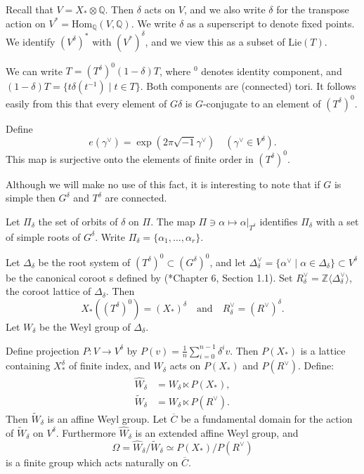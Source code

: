 \documentclass[10pt,leqno]{article}
\newcommand{\Hom}{\text{Hom}}
\newcommand{\Lie}{\text{Lie}}
\newcommand{\Z}{\mathbb Z}
\newcommand{\Q}{\mathbb Q}
\newcommand{\ch}[1]{#1^\vee}
\newcommand\inv{^{-1}}
\newcommand\wt{\widetilde}
\newcommand\wh{\widehat}
\begin{document}
Recall that $V=X_*\otimes\Q$. Then $\delta$ acts on $V$, and we also write
$\delta$ for the transpose action on $V^*=\Hom_\Q(V,\Q)$.
We write $\delta$ as a superscript to denote fixed points.
We identify $(V^\delta)^*$ with $(V^*)^\delta$, and we view this as a subset of $\Lie(T)$.

We can write $T=(T^\delta)^0(1-\delta)T$, where $\phantom{}^0$ denotes identity component,
and $(1-\delta)T=\{t\delta(t\inv)\mid t\in T\}$. Both components are (connected) tori.
It follows easily from this that every element of $G\delta$ is $G$-conjugate
to an element of $(T^\delta)^0$.

Define
\begin{equation}
\label{e:e}
e(\ch\gamma)=\exp(2\pi \sqrt{-1}\ch\gamma) \quad(\ch\gamma\in V^\delta).
\end{equation}
This map is surjective  onto the elements of finite order in $(T^\delta)^0$.

Although we will make no use of this fact, it is interesting to note that if $G$ is simple then
$G^\delta$  and $T^\delta$ are connected.

Let $\Pi_\delta$ the set of orbits of $\delta$ on $\Pi$. The map
$\Pi\ni\alpha\mapsto \alpha|_{T^{\delta}}$ identifies $\Pi_\delta$ with 
a set of simple roots of 
$G^{\delta}$. Write $\Pi_\delta=\{\alpha_1,\dots,\alpha_r\}$.

Let $\Delta_\delta$ be the root system of
$(T^{\delta})^0\subset (G^{\delta})^0$, and let
$\ch\Delta_\delta=\{\ch\alpha\mid \alpha\in\Delta_\delta\}\subset
V^\delta$ be the canonical coroot
s defined by
(\cite{bourbaki_4-6}*{Chapter 6, Section 1.1}).
Set $\ch R_\delta=\Z\langle\ch\Delta_\delta\rangle$, the coroot lattice of $\Delta_\delta$.
Then
$$
X_*((T^{\delta})^0)=(X_*)^\delta\quad\text{and}\quad \ch R_\delta=(\ch R)^\delta.
$$
Let $W_\delta$ be the Weyl group of $\Delta_\delta$.

Define projection $P:V\rightarrow V^\delta$ by
$P(v)=\frac1n \sum_{i=0}^{n-1}\delta^iv$.
Then $P(X_*)$ is a lattice containing $X_*^\delta$ of finite index,
and $W_\delta$ acts on $P(X_*)$ and $P(\ch R)$. Define:
\begin{equation}
\label{e:affine}
\begin{aligned}
\wh W_\delta&=W_\delta\ltimes P(X_*), \\
\wt W_\delta&=W_\delta\ltimes P(\ch R).
\end{aligned}
\end{equation}
Then $\wt W_\delta$ is an affine Weyl group. Let $\overline C$ be a
fundamental domain for the action of $\wt W_\delta$ on $V^\delta$.
Furthermore
$\wh W_\delta$ is an extended affine Weyl group, and
$$
\Omega=\wh W_\delta/\wt W_\delta\simeq P(X_*)/P(\ch R)
$$
is a finite group which acts naturally on $\overline C$.
\end{document}
